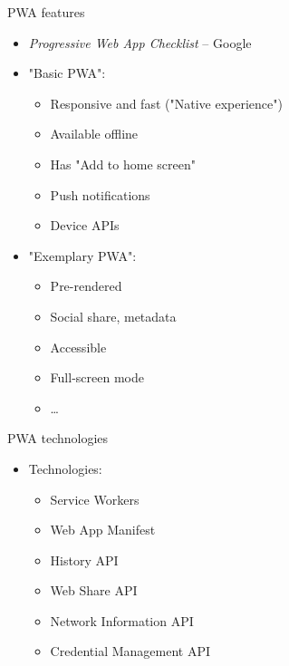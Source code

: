 \documentclass[presentation]{beamer}
\begin{document}
\begin{frame}[label={sec:org1ce6ebf}]{PWA features}
\begin{itemize}
\item \emph{Progressive Web App Checklist} -- Google
\end{itemize}
\pause
\begin{itemize}
\item "Basic PWA":
\begin{itemize}
\item Responsive and fast ("Native experience")
\item Available offline
\item Has "Add to home screen"
\item Push notifications
\item Device APIs
\end{itemize}
\end{itemize}
\pause
\begin{itemize}
\item "Exemplary PWA":
\begin{itemize}
\item Pre-rendered
\item Social share, metadata
\item Accessible
\item Full-screen mode
\item \ldots{}
\end{itemize}
\end{itemize}
\end{frame}

\begin{frame}[label={sec:orgb5779f4}]{PWA technologies}
\begin{itemize}
\item Technologies:
\begin{itemize}
\item Service Workers
\item Web App Manifest
\item History API
\item Web Share API
\item Network Information API
\item Credential Management API
\end{itemize}
\end{itemize}
\end{frame}
\end{document}
